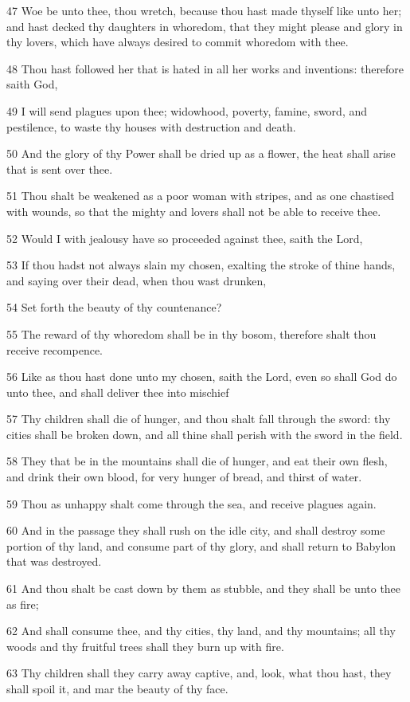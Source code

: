 \par 47 Woe be unto thee, thou wretch, because thou hast made thyself like unto her; and hast decked thy daughters in whoredom, that they might please and glory in thy lovers, which have always desired to commit whoredom with thee.
\par 48 Thou hast followed her that is hated in all her works and inventions: therefore saith God,
\par 49 I will send plagues upon thee; widowhood, poverty, famine, sword, and pestilence, to waste thy houses with destruction and death.
\par 50 And the glory of thy Power shall be dried up as a flower, the heat shall arise that is sent over thee.
\par 51 Thou shalt be weakened as a poor woman with stripes, and as one chastised with wounds, so that the mighty and lovers shall not be able to receive thee.
\par 52 Would I with jealousy have so proceeded against thee, saith the Lord,
\par 53 If thou hadst not always slain my chosen, exalting the stroke of thine hands, and saying over their dead, when thou wast drunken,
\par 54 Set forth the beauty of thy countenance?
\par 55 The reward of thy whoredom shall be in thy bosom, therefore shalt thou receive recompence.
\par 56 Like as thou hast done unto my chosen, saith the Lord, even so shall God do unto thee, and shall deliver thee into mischief
\par 57 Thy children shall die of hunger, and thou shalt fall through the sword: thy cities shall be broken down, and all thine shall perish with the sword in the field.
\par 58 They that be in the mountains shall die of hunger, and eat their own flesh, and drink their own blood, for very hunger of bread, and thirst of water.
\par 59 Thou as unhappy shalt come through the sea, and receive plagues again.
\par 60 And in the passage they shall rush on the idle city, and shall destroy some portion of thy land, and consume part of thy glory, and shall return to Babylon that was destroyed.
\par 61 And thou shalt be cast down by them as stubble, and they shall be unto thee as fire;
\par 62 And shall consume thee, and thy cities, thy land, and thy mountains; all thy woods and thy fruitful trees shall they burn up with fire.
\par 63 Thy children shall they carry away captive, and, look, what thou hast, they shall spoil it, and mar the beauty of thy face.

